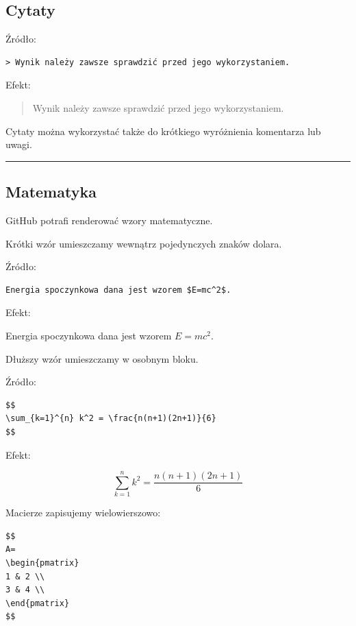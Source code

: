 \documentclass[11pt, a4paper]{article}
\begin{document}
\subsection{Cytaty}

Źródło:

\begin{verbatim}
> Wynik należy zawsze sprawdzić przed jego wykorzystaniem.
\end{verbatim}

Efekt:

\begin{quote}
Wynik należy zawsze sprawdzić przed jego wykorzystaniem.
\end{quote}

Cytaty można wykorzystać także do krótkiego wyróżnienia komentarza lub uwagi.

\medskip\hrule\medskip

\subsection{Matematyka}

GitHub potrafi renderować wzory matematyczne.

Krótki wzór umieszczamy wewnątrz pojedynczych znaków dolara.

Źródło:

\begin{verbatim}
Energia spoczynkowa dana jest wzorem $E=mc^2$.
\end{verbatim}

Efekt:

Energia spoczynkowa dana jest wzorem $E=mc^2$.

Dłuższy wzór umieszczamy w osobnym bloku.

Źródło:

\begin{verbatim}
$$
\sum_{k=1}^{n} k^2 = \frac{n(n+1)(2n+1)}{6}
$$
\end{verbatim}

Efekt:

\[
\sum_{k=1}^{n} k^2 = \frac{n(n+1)(2n+1)}{6}
\]

Macierze zapisujemy wielowierszowo:

\begin{verbatim}
$$
A=
\begin{pmatrix}
1 & 2 \\
3 & 4 \\
\end{pmatrix}
$$
\end{verbatim}
\end{document}
